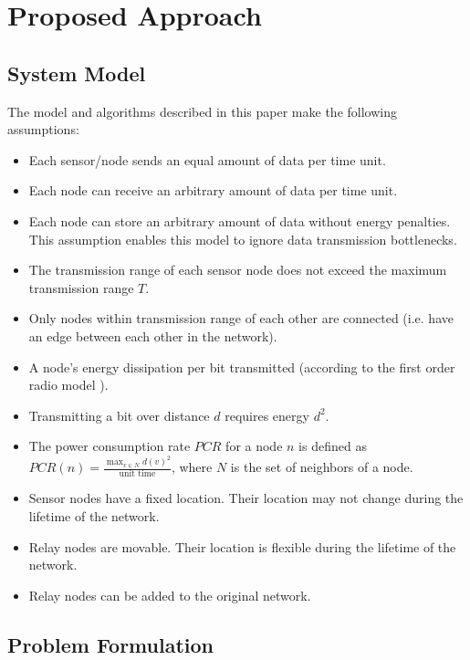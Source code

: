 \section{Proposed Approach}\label{approach}

\subsection{System Model}
The model and algorithms described in this paper make the following assumptions:

\begin{itemize}
\item Each sensor/node sends an equal amount of data per time unit.
\item Each node can receive an arbitrary amount of data per time unit.
\item Each node can store an arbitrary amount of data without energy penalties. This assumption enables this model to ignore data transmission bottlenecks.
\item The transmission range of each sensor node does not exceed the maximum transmission range $T$.
\item Only nodes within transmission range of each other are connected (i.e. have an edge between each other in the network).
\item A node's energy dissipation per bit transmitted (according to the first order radio model \cite{820485}).
\item Transmitting a bit over distance $d$ requires energy $d^2$.
\item The power consumption rate $PCR$ for a node $n$ is defined as $PCR(n) = \frac{\max_{v \in N}d(v)^2}{\textrm{unit time}}$, where $N$ is the set of neighbors of a node.
\item Sensor nodes have a fixed location. Their location may not change during the lifetime of the network.
\item Relay nodes are movable. Their location is flexible during the lifetime of the network.
\item Relay nodes can be added to the original network.
\end{itemize}

\subsection{Problem Formulation}

